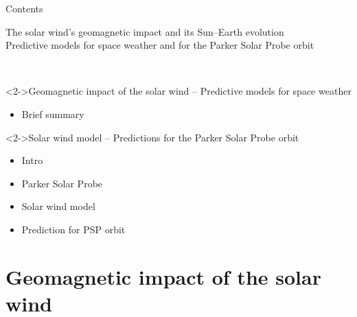 \begin{frame}[c]{Contents}{}
	\begin{block}{}
		\color{blue} \centering \Large The solar wind's geomagnetic impact and its Sun–Earth evolution\\
		\large Predictive models for space weather and for the Parker Solar Probe orbit
	\end{block}
	
	\ 
	
	\begin{block}<2->{Geomagnetic impact of the solar wind -- Predictive models for space weather}
		\begin{itemize}
			\item Brief summary
		\end{itemize}
	\end{block}
	\begin{block}<2->{Solar wind model -- Predictions for the Parker Solar Probe orbit}
		\begin{itemize}
			\item Intro
			\item Parker Solar Probe
			\item Solar wind model
			\item Prediction for PSP orbit
		\end{itemize}
	\end{block}
\end{frame}


\section{Geomagnetic impact of the solar wind}

